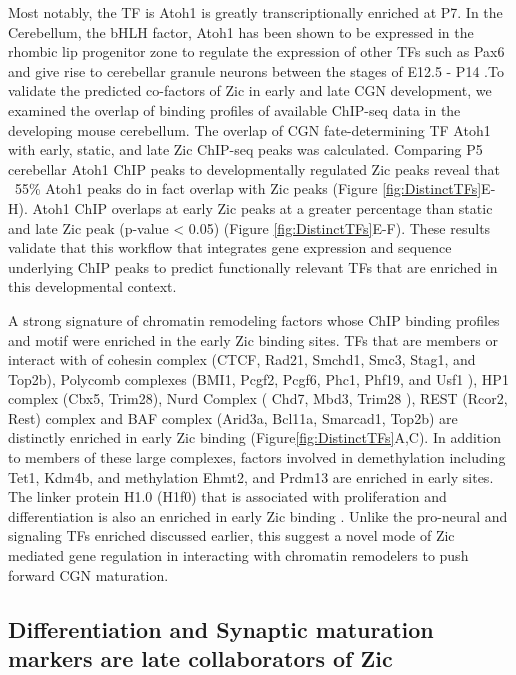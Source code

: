 \documentclass[fleqn,10pt]{wlscirep}
\begin{document}
Most notably, the TF is Atoh1 is greatly transcriptionally enriched at P7. In the Cerebellum, the bHLH factor, Atoh1 has been shown to be expressed in the rhombic lip progenitor zone to regulate the expression of other TFs such as Pax6 and give rise to cerebellar granule neurons between the stages of E12.5 - P14 \cite{Aruga2018ZicDisease, Yeung2014WlsDevelopment, Wang2005Math1Cerebellum, Ben-Arie1997Math1Neurons}.To validate the predicted co-factors of Zic in early and late CGN development, we examined the overlap of binding profiles of available ChIP-seq data in the developing mouse cerebellum. The overlap of CGN fate-determining TF Atoh1 with early, static, and late Zic ChIP-seq peaks was calculated. Comparing P5 cerebellar Atoh1 ChIP peaks to developmentally regulated Zic peaks reveal that ~55\%  Atoh1  peaks do in fact overlap with Zic peaks (Figure \ref{fig:DistinctTFs}E-H). Atoh1 ChIP overlaps at early Zic peaks at a greater percentage than static and late Zic peak (p-value < 0.05) (Figure \ref{fig:DistinctTFs}E-F). These results validate that this workflow that integrates gene expression and sequence underlying ChIP peaks to predict functionally relevant TFs that are enriched in this developmental context.

A strong signature of chromatin remodeling factors whose ChIP binding profiles and motif were enriched in the early Zic binding sites. TFs that are members or interact with of cohesin complex  (CTCF, Rad21, Smchd1, Smc3, Stag1, and Top2b), Polycomb  complexes (BMI1, Pcgf2, Pcgf6, Phc1, Phf19, and Usf1 ), HP1 complex (Cbx5, Trim28), Nurd Complex ( Chd7, Mbd3, Trim28 ), REST (Rcor2, Rest) complex and BAF complex (Arid3a, Bcl11a, Smarcad1, Top2b) are distinctly enriched in early Zic binding (Figure\ref{fig:DistinctTFs}A,C). In addition to members of these large complexes, factors involved in demethylation including Tet1, Kdm4b, and methylation Ehmt2, and Prdm13 are enriched in early sites. The linker protein H1.0 (H1f0) that is associated with proliferation and differentiation is also an enriched in early Zic binding \cite{DiLiegro2018H1.0Differentiation}. Unlike the pro-neural and signaling TFs enriched discussed earlier, this suggest a novel mode of Zic mediated gene regulation in interacting with chromatin remodelers to push forward CGN maturation.

\subsection*{Differentiation and Synaptic maturation markers are late collaborators of Zic}
\end{document}
